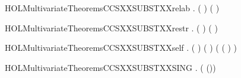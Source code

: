 \newcommand{\HOLMultivariateTheoremsCCSXXSUBSTXXreduce}{\UseVerbatim{HOLMultivariateTheoremsCCSXXSUBSTXXreduce}}
\begin{SaveVerbatim}{HOLMultivariateTheoremsCCSXXSUBSTXXrelab}
\HOLTokenTurnstile{} \HOLSymConst{\HOLTokenForall{}}  .
         (  ) \HOLSymConst{=}  (  ) 
\end{SaveVerbatim}
\newcommand{\HOLMultivariateTheoremsCCSXXSUBSTXXrelab}{\UseVerbatim{HOLMultivariateTheoremsCCSXXSUBSTXXrelab}}
\begin{SaveVerbatim}{HOLMultivariateTheoremsCCSXXSUBSTXXrestr}
\HOLTokenTurnstile{} \HOLSymConst{\HOLTokenForall{}}  .   (\HOLConst{\ensuremath{\nu}}  ) \HOLSymConst{=} \HOLConst{\ensuremath{\nu}}  (  )
\end{SaveVerbatim}
\newcommand{\HOLMultivariateTheoremsCCSXXSUBSTXXrestr}{\UseVerbatim{HOLMultivariateTheoremsCCSXXSUBSTXXrestr}}
\begin{SaveVerbatim}{HOLMultivariateTheoremsCCSXXSUBSTXXself}
\HOLTokenTurnstile{} \HOLSymConst{\HOLTokenForall{}} .
         \HOLSymConst{\HOLTokenConj{}}  ( ) ( ) \HOLSymConst{\HOLTokenImp{}}
       ( ( \HOLSymConst{\HOLTokenMapto{}}   )  \HOLSymConst{=} )
\end{SaveVerbatim}
\newcommand{\HOLMultivariateTheoremsCCSXXSUBSTXXself}{\UseVerbatim{HOLMultivariateTheoremsCCSXXSUBSTXXself}}
\begin{SaveVerbatim}{HOLMultivariateTheoremsCCSXXSUBSTXXSING}
\HOLTokenTurnstile{} \HOLSymConst{\HOLTokenForall{}}  .  ( \HOLSymConst{|+} (\HOLSymConst{,}))  \HOLSymConst{=}    
\end{SaveVerbatim}
\newcommand{\HOLMultivariateTheoremsCCSXXSUBSTXXSING}{\UseVerbatim{HOLMultivariateTheoremsCCSXXSUBSTXXSING}}
